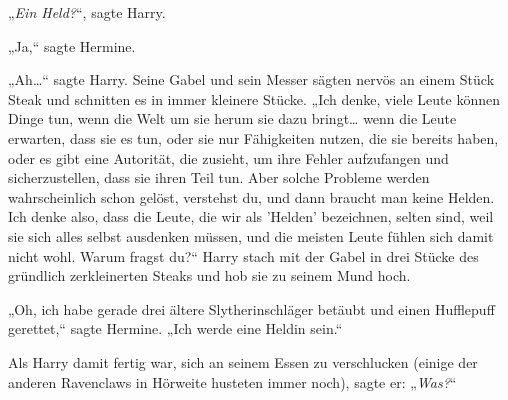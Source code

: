 „\emph{Ein Held?}“, sagte Harry.

„Ja,“ sagte Hermine.

„Ah…“ sagte Harry. Seine Gabel und sein Messer sägten nervös an einem Stück Steak und schnitten es in immer kleinere Stücke. „Ich denke, viele Leute können Dinge tun, wenn die Welt um sie herum sie dazu bringt… wenn die Leute erwarten, dass sie es tun, oder sie nur Fähigkeiten nutzen, die sie bereits haben, oder es gibt eine Autorität, die zusieht, um ihre Fehler aufzufangen und sicherzustellen, dass sie ihren Teil tun. Aber solche Probleme werden wahrscheinlich schon gelöst, verstehst du, und dann braucht man keine Helden. Ich denke also, dass die Leute, die wir als 'Helden' bezeichnen, selten sind, weil sie sich alles selbst ausdenken müssen, und die meisten Leute fühlen sich damit nicht wohl. Warum fragst du?“ Harry stach mit der Gabel in drei Stücke des gründlich zerkleinerten Steaks und hob sie zu seinem Mund hoch.

„Oh, ich habe gerade drei ältere Slytherinschläger betäubt und einen Hufflepuff gerettet,“ sagte Hermine. „Ich werde eine Heldin sein.“

Als Harry damit fertig war, sich an seinem Essen zu verschlucken (einige der anderen Ravenclaws in Hörweite husteten immer noch), sagte er: „\emph{Was?}“


